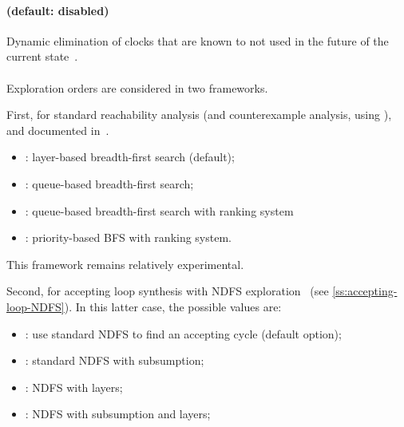 \paragraph{ (default: disabled)}
Dynamic elimination of clocks that are known to not used in the future of the current state~\cite{Andre13FSFMA}.


\paragraph{ } %
Exploration orders are considered in two frameworks.

First, for standard reachability analysis (and counterexample analysis, using ), and documented in~\cite{ANP17}.
\begin{itemize}
	\item {}: layer-based breadth-first search (default);
	\item {}: queue-based breadth-first search;
	\item {}: queue-based breadth-first search with ranking system
	\item {}: priority-based BFS with ranking system.
\end{itemize}
%
This framework remains relatively experimental.

Second, for accepting loop synthesis with NDFS exploration~\cite{NPP18} (see \cref{ss:accepting-loop-NDFS}).
In this latter case, the possible values are:
\begin{itemize}
\item {}: use standard NDFS to find an accepting cycle (default option);
\item {}: standard NDFS with subsumption;
\item {}: NDFS with layers;
\item {}: NDFS with subsumption and layers;
\end{itemize}



